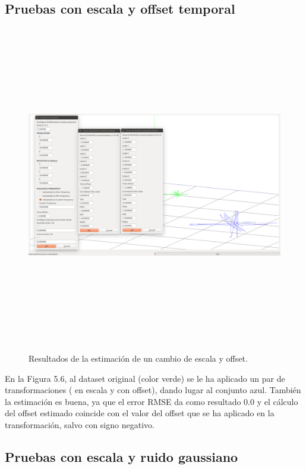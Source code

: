 \subsection{Pruebas con escala y offset temporal}
\begin{figure}[H]
\begin{center}
\label{fig:opciones de View}\includegraphics[height=14.0cm,width=18.0cm]{img/cap6/Escala_Offset_abba.png}
\hspace{0.5cm}

\end{center}

\caption{Resultados de la estimación de un cambio de escala y offset.}
\end{figure}

En la Figura 5.6, al dataset original (color verde) se le ha aplicado un par de transformaciones ( en escala y con offset), dando lugar al conjunto azul. También la estimación es buena, ya que el error RMSE da como resultado 0.0 y el cálculo del offset estimado coincide con el valor del offset que se ha aplicado en la transformación, salvo con signo negativo.

\subsection{Pruebas con escala y ruido gaussiano}

